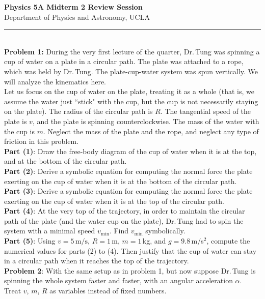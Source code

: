 \documentclass[11pt]{article}
\begin{document}
\Large \noindent \textbf{Physics 5A Midterm 2 Review Session}\\
\normalsize
Department of Physics and Astronomy, UCLA\\
\noindent\rule{8cm}{0.4pt}\\

\noindent\textbf{Problem 1:} During the very first lecture of the quarter, Dr.\,Tung was spinning a cup of water on a plate in a circular path. The plate was attached to a rope, which was held by Dr.\,Tung. The plate-cup-water system was spun vertically. We will analyze the kinematics here.\\

Let us focus on the cup of water on the plate, treating it as a whole (that is, we assume the water just ``stick" with the cup, but the cup is not necessarily staying on the plate). The radius of the circular path is $R$. The tangential speed of the plate is $v$, and the plate is spinning counterclockwise. The mass of the water with the cup is $m$. Neglect the mass of the plate and the rope, and neglect any type of friction in this problem.\\

\textbf{Part (1)}: Draw the free-body diagram of the cup of water when it is at the top, and at the bottom of the circular path.\\

\textbf{Part (2)}: Derive a symbolic equation for computing the normal force the plate exerting on the cup of water when it is at the bottom of the circular path.\\

\textbf{Part (3)}: Derive a symbolic equation for computing the normal force the plate exerting on the cup of water when it is at the top of the circular path.\\


\textbf{Part (4)}: At the very top of the trajectory, in order to maintain the circular path of the plate (and the water cup on the plate), Dr.\,Tung had to spin the system with a minimal speed $v_{\min}$. Find $v_{\min}$ symbolically. \\

\textbf{Part (5)}: Using $v=5\,\text{m/s}$, $R = 1\,$m, $m=1\,$kg, and $g = 9.8\,$m/s$^2$,  compute the numerical values for parts (2) to (4). Then justify that the cup of water can stay in a circular path when it reaches the top of the trajectory. \\


\newpage
\noindent\textbf{Problem 2}: With the same setup as in problem 1, but now suppose Dr.\,Tung is spinning the whole system faster and faster, with an angular acceleration $\alpha$. Treat $v$, $m$, $R$ as variables instead of fixed numbers.\\
\end{document}
